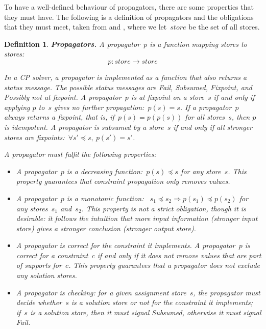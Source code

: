 \documentclass[a4paper,11pt]{article}
\newtheorem{definition}{Definition}
\numberwithin{equation}{section}
\begin{document}
To have a well-defined behaviour of propagators, there are some properties that
they must have. The following is a definition of propagators and the obligations
that they must meet, taken from \cite{SchulteCarlsson:FDsys} and \cite{Gecode:MPG},
where we let~$store$ be the set of all stores.

\begin{definition} \label{def:prop}
  \textbf{Propagators.} A \emph{propagator}~$p$ is a function mapping stores to stores:
  \begin{equation*}
    p: store \to store
  \end{equation*}

  In a CP solver, a propagator is implemented as a function that also returns 
  a \emph{status message}.
  The possible status messages are \emph{Fail}, \emph{Subsumed},
  \emph{Fixpoint}, and \emph{Possibly not at fixpoint}. 
  A propagator~$p$ is at \emph{fixpoint} on a store~$s$ if and only if applying 
  $p$ to~$s$ gives no further propagation:~$p(s) = s$.
  If a propagator~$p$ always returns a fixpoint, that is, 
  if~$p(s) = p(p(s))$ for all stores~$s$, then $p$ is \emph{idempotent}.
  A propagator is \emph{subsumed} by a store~$s$ if and only if
  all stronger stores are fixpoints:~$\forall s'\preceq s, \ p(s')=s'$.

  A propagator must fulfil the following properties:

  \begin{itemize}
  \item A propagator~$p$ is a decreasing function:~$p(s) \preceq s$ for any store~$s$.
    This property guarantees that constraint propagation only removes values.

  \item A propagator~$p$ is a monotonic function:
    ~$s_1 \preceq s_2 \Rightarrow p(s_1) \preceq p(s_2)$
    for any stores~$s_1$ and~$s_2$.
    This property is not a strict obligation, though it is desirable:
    it follows the intuition that more input information (stronger input store)
    gives a stronger conclusion (stronger output store).
    
  \item A propagator is correct for the constraint it implements.
    A propagator~$p$
    is \emph{correct} for a constraint~$c$ if and only if it does not
    remove values that are part of supports for~$c$.
    This property guarantees that a propagator does not exclude any
    solution stores.

  \item A propagator is \emph{checking}: for a given assignment store~$s$, the propagator
    must decide whether~$s$ is a solution store or not for the constraint it
    implements; if~$s$ is a solution store, then it must signal \emph{Subsumed},
    otherwise it must signal \emph{Fail}.


\end{itemize}
\end{definition}
\end{document}
